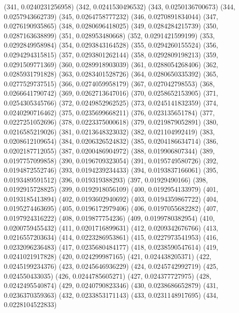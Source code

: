 {					(341, 0.0240231256958)
					(342, 0.0241530496532)
					(343, 0.0250136700673)
					(344, 0.0257943662739)
					(345, 0.0264758777232)
					(346, 0.0270891834044)
					(347, 0.0276190935865)
					(348, 0.0280696418025)
					(349, 0.0284284215739)
					(350, 0.0287163638899)
					(351, 0.028953480668)
					(352, 0.0291421599199)
					(353, 0.0292849958984)
					(354, 0.0293843164528)
					(355, 0.0294260155524)
					(356, 0.0294294315815)
					(357, 0.0293801262144)
					(358, 0.0292809198213)
					(359, 0.0291509771369)
					(360, 0.0289918903039)
					(361, 0.0288054268406)
					(362, 0.0285931791828)
					(363, 0.0283401528726)
					(364, 0.0280650335392)
					(365, 0.0277529737515)
					(366, 0.0274059958179)
					(367, 0.027042798553)
					(368, 0.0266641790742)
					(369, 0.0262713647016)
					(370, 0.0258652153905)
					(371, 0.0254305345766)
					(372, 0.0249852962525)
					(373, 0.0245141832359)
					(374, 0.0240290716462)
					(375, 0.0235699668211)
					(376, 0.023135651784)
					(377, 0.0227251052696)
					(378, 0.0223375000618)
					(379, 0.0219879052891)
					(380, 0.0216585219026)
					(381, 0.0213648323032)
					(382, 0.021104992419)
					(383, 0.0208612109654)
					(384, 0.0206326524832)
					(385, 0.0204186634714)
					(386, 0.0202187712055)
					(387, 0.0200486904972)
					(388, 0.019906807344)
					(389, 0.0197757099858)
					(390, 0.0196709323054)
					(391, 0.0195749580726)
					(392, 0.0194872552746)
					(393, 0.0194239234433)
					(394, 0.0193837166061)
					(395, 0.0193489591512)
					(396, 0.019319388293)
					(397, 0.01929490166)
					(398, 0.0192915728825)
					(399, 0.0192918056109)
					(400, 0.0192954133979)
					(401, 0.0193185413894)
					(402, 0.0193602940692)
					(403, 0.0194359867722)
					(404, 0.0195274463695)
					(405, 0.0196172979406)
					(406, 0.0197055682282)
					(407, 0.0197924316222)
					(408, 0.019877754236)
					(409, 0.0199780382954)
					(410, 0.0200759455432)
					(411, 0.0201716899631)
					(412, 0.0209342676766)
					(413, 0.0216557203634)
					(414, 0.0223286953861)
					(415, 0.0227973541953)
					(416, 0.0232096236483)
					(417, 0.0235680484177)
					(418, 0.0238590547614)
					(419, 0.0241021917828)
					(420, 0.024299987165)
					(421, 0.024438205371)
					(422, 0.0245199234376)
					(423, 0.0245646936229)
					(424, 0.0245742992719)
					(425, 0.024550433035)
					(426, 0.0244785605271)
					(427, 0.024377727975)
					(428, 0.0242495540874)
					(429, 0.0240790823346)
					(430, 0.0238686652879)
					(431, 0.0236370359363)
					(432, 0.0233853171143)
					(433, 0.0231148917695)
					(434, 0.0228104522833)
}
